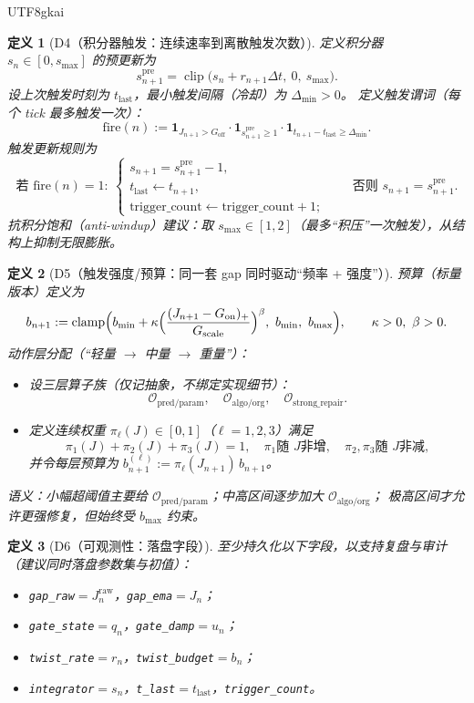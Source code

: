 \documentclass[12pt]{article}
\newtheorem{definition}{定义}[section]
\newcommand{\indicator}[1]{\mathbf{1}_{#1}}
\newcommand{\clip}{\operatorname{clip}}
\newcommand{\clamp}{\operatorname{clamp}}
\begin{document}
\begin{CJK*}{UTF8}{gkai}
\begin{definition}[D4（积分器触发：连续速率到离散触发次数）]
\label{def:tex28-d4}
定义积分器 $s_n\in[0,s_{\max}]$ 的预更新为
\[
  s_{n+1}^{\mathrm{pre}}=\clip\bigl(s_n+r_{n+1}\Delta t,\ 0,\ s_{\max}\bigr).
\]
设上次触发时刻为 $t_{\mathrm{last}}$，最小触发间隔（冷却）为 $\Delta_{\min}>0$。
定义触发谓词（每个 tick 最多触发一次）：
\[
  \mathrm{fire}(n):=\indicator{J_{n+1}>G_{\mathrm{off}}}\cdot
  \indicator{s_{n+1}^{\mathrm{pre}}\ge 1}\cdot
  \indicator{t_{n+1}-t_{\mathrm{last}}\ge\Delta_{\min}}.
\]
触发更新规则为
\[
  \text{若 }\mathrm{fire}(n)=1:\
  \begin{cases}
    s_{n+1}=s_{n+1}^{\mathrm{pre}}-1,\\
    t_{\mathrm{last}}\leftarrow t_{n+1},\\
    \mathrm{trigger\_count} \leftarrow \mathrm{trigger\_count}+1;
  \end{cases}
  \qquad
  \text{否则 } s_{n+1}=s_{n+1}^{\mathrm{pre}}.
\]
抗积分饱和（anti-windup）建议：取 $s_{\max}\in[1,2]$（最多“积压”一次触发），从结构上抑制无限膨胀。
\end{definition}

\begin{definition}[D5（触发强度/预算：同一套 gap 同时驱动“频率 + 强度”）]
\label{def:tex28-d5}
预算（标量版本）定义为
\[
  b_{n+1}:=\clamp\Bigl(b_{\min}+\kappa\Bigl(\frac{(J_{n+1}-G_{\mathrm{on}})_{+}}{G_{\mathrm{scale}}}\Bigr)^{\beta},\
    b_{\min},\ b_{\max}\Bigr),
  \qquad
  \kappa>0,\ \beta>0.
\]
动作层分配（“轻量 $\to$ 中量 $\to$ 重量”）：
\begin{itemize}
  \item 设三层算子族（仅记抽象，不绑定实现细节）：
  \[
    \mathcal{O}_{\mathrm{pred/param}},\quad
    \mathcal{O}_{\mathrm{algo/org}},\quad
    \mathcal{O}_{\mathrm{strong\_repair}}.
  \]
  \item 定义连续权重 $\pi_\ell(J)\in[0,1]$（$\ell=1,2,3$）满足
  \[
    \pi_1(J)+\pi_2(J)+\pi_3(J)=1,\quad
    \pi_1 \text{随 }J\text{非增},\quad
    \pi_2,\pi_3 \text{随 }J\text{非减},
  \]
  并令每层预算为 $b^{(\ell)}_{n+1}:=\pi_\ell(J_{n+1})\,b_{n+1}$。
\end{itemize}
语义：小幅超阈值主要给 $\mathcal{O}_{\mathrm{pred/param}}$；中高区间逐步加大 $\mathcal{O}_{\mathrm{algo/org}}$；
极高区间才允许更强修复，但始终受 $b_{\max}$ 约束。
\end{definition}

\begin{definition}[D6（可观测性：落盘字段）]
\label{def:tex28-d6}
至少持久化以下字段，以支持复盘与审计（建议同时落盘参数集与初值）：
\begin{itemize}
  \item \texttt{gap\_raw}$=J^{\mathrm{raw}}_n$，\texttt{gap\_ema}$=J_n$；
  \item \texttt{gate\_state}$=q_n$，\texttt{gate\_damp}$=u_n$；
  \item \texttt{twist\_rate}$=r_n$，\texttt{twist\_budget}$=b_n$；
  \item \texttt{integrator}$=s_n$，\texttt{t\_last}$=t_{\mathrm{last}}$，\texttt{trigger\_count}。
\end{itemize}
\end{definition}


\end{CJK*}
\end{document}
